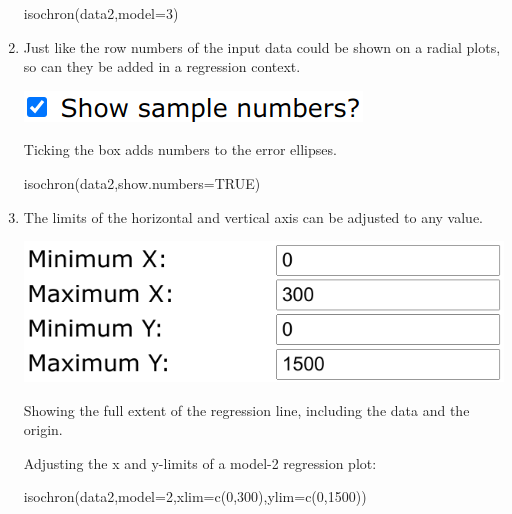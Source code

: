 \begin{refsection}
\begin{enumerate}
\begin{console}
isochron(data2,model=3)
\end{console}
  
\item Just like the row numbers of the input data could be shown on a
  radial plots, so can they be added in a regression context.

  \noindent\begin{minipage}[t]{.28\linewidth}
  \strut\vspace*{-\baselineskip}\newline
  \includegraphics[width=\linewidth]{../figures/concordiashownumbers.png}
\end{minipage}
\begin{minipage}[t]{.72\linewidth}
Ticking the box adds numbers to the error ellipses.
\end{minipage}

\begin{console}
isochron(data2,show.numbers=TRUE)
\end{console}

\item The limits of the horizontal and vertical axis can be adjusted
  to any value.

\noindent\begin{minipage}[t]{.45\linewidth}
  \strut\vspace*{-\baselineskip}\newline
  \includegraphics[width=\linewidth]{../figures/OtherRegressionXYlims.png}
\end{minipage}
\begin{minipage}[t]{.55\linewidth}
Showing the full extent of the regression line, including the data and
the origin.
\end{minipage}

Adjusting the x and y-limits of a model-2 regression plot:

\begin{console}
isochron(data2,model=2,xlim=c(0,300),ylim=c(0,1500))
\end{console}


\end{enumerate}
\end{refsection}
